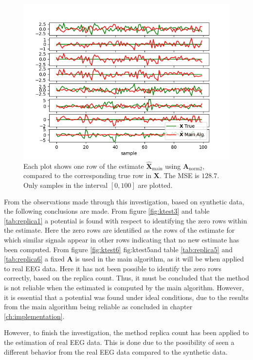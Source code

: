 \begin{figure}[H]
\centering
\includegraphics[scale=0.5]{figures/ch_estimate/k_test5.png}
\caption{Each plot shows one row of the estimate $\hat{\mathbf{X}}_{\text{main}}$ using $\mathbf{A}_{\text{norm2}}$, compared to the corresponding true row in $\mathbf{X}$. The MSE is $128.7$. Only samples in the interval $[0,100]$ are plotted.}
\label{fig:ktest5}
\end{figure}
\noindent
From the observations made through this investigation, based on synthetic data, the following conclusions are made.
From figure \ref{fig:ktest3} and table \ref{tab:replica1} a potential is found with respect to identifying the zero rows within the estimate. 
Here the zero rows are identified as the rows of the estimate for which similar signals appear in other rows indicating that no new estimate has been computed. 
From figure \ref{fig:ktest6} {fig:ktest5}and table \ref{tab:replica5} and \ref{tab:replica6} a fixed $\mathbf{A}$ is used in the main algorithm, as it will be when applied to real EEG data. 
Here it has not been possible to identify the zero rows correctly, based on the replica count. 
Thus, it must be concluded that the method is not reliable when the estimated is computed by the main algorithm. 
However, it is essential that a potential was found under ideal conditions, due to the results from the main algorithm being reliable as concluded in chapter \ref{ch:implementation}. 

However, to finish the investigation, the method replica count has been applied to the estimation of real EEG data. This is done due to the possibility of seen a different behavior from the real EEG data compared to the synthetic data. 

